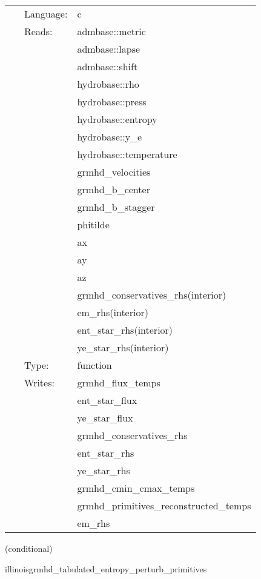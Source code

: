 \documentclass{article}
\begin{document}
 \begin{tabular*}{160mm}{cll} 
~ & Language:  & c \\ 
~ & Reads:  & admbase::metric \\ 
~& ~ &admbase::lapse\\ 
~& ~ &admbase::shift\\ 
~& ~ &hydrobase::rho\\ 
~& ~ &hydrobase::press\\ 
~& ~ &hydrobase::entropy\\ 
~& ~ &hydrobase::y\_e\\ 
~& ~ &hydrobase::temperature\\ 
~& ~ &grmhd\_velocities\\ 
~& ~ &grmhd\_b\_center\\ 
~& ~ &grmhd\_b\_stagger\\ 
~& ~ &phitilde\\ 
~& ~ &ax\\ 
~& ~ &ay\\ 
~& ~ &az\\ 
~& ~ &grmhd\_conservatives\_rhs(interior)\\ 
~& ~ &em\_rhs(interior)\\ 
~& ~ &ent\_star\_rhs(interior)\\ 
~& ~ &ye\_star\_rhs(interior)\\ 
~ & Type:  & function \\ 
~ & Writes:  & grmhd\_flux\_temps \\ 
~& ~ &ent\_star\_flux\\ 
~& ~ &ye\_star\_flux\\ 
~& ~ &grmhd\_conservatives\_rhs\\ 
~& ~ &ent\_star\_rhs\\ 
~& ~ &ye\_star\_rhs\\ 
~& ~ &grmhd\_cmin\_cmax\_temps\\ 
~& ~ &grmhd\_primitives\_reconstructed\_temps\\ 
~& ~ &em\_rhs\\ 
\end{tabular*} 


\vspace{5mm}

   (conditional) 

\hspace{5mm} illinoisgrmhd\_tabulated\_entropy\_perturb\_primitives 

\hspace{5mm}{\it entropy+tabulated version of illinoisgrmhd\_perturb\_primitives } 
\end{document}
